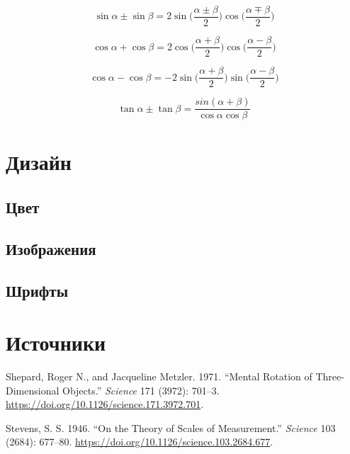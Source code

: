 \documentclass[
  letterpaper,
  DIV=11,
  numbers=noendperiod]{scrreprt}
\newlength{\cslhangindent}
\newenvironment{CSLReferences}[2] %
 {\begin{list}{}{%
  \setlength{\itemindent}{0pt}
  \setlength{\leftmargin}{0pt}
  \setlength{\parsep}{0pt}
  \ifodd #1
   \setlength{\leftmargin}{\cslhangindent}
   \setlength{\itemindent}{-1\cslhangindent}
  \fi
  \setlength{\itemsep}{#2\baselineskip}}}
 {\end{list}}
\theoremstyle{definition}
\theoremstyle{remark}
\begin{document}
\[
\sin \alpha \pm \sin \beta = 2 \sin \Big(\frac{\alpha \pm \beta}{2}\Big) \cos \Big(\frac{\alpha \mp \beta}{2}\Big)
\]

\[
\cos \alpha + \cos \beta = 2 \cos \Big(\frac{\alpha + \beta}{2}\Big) \cos \Big(\frac{\alpha - \beta}{2}\Big)
\]

\[
\cos \alpha - \cos \beta = -2 \sin \Big(\frac{\alpha + \beta}{2}\Big) \sin \Big(\frac{\alpha - \beta}{2}\Big)
\]

\[
\tan \alpha \pm \tan \beta = \frac{sin(\alpha + \beta)}{\cos \alpha \cos \beta}
\]


\chapter{Дизайн}\label{ux434ux438ux437ux430ux439ux43d}

\section{Цвет}\label{ux446ux432ux435ux442}

\section{Изображения}\label{ux438ux437ux43eux431ux440ux430ux436ux435ux43dux438ux44f}

\section{Шрифты}\label{ux448ux440ux438ux444ux442ux44b}


\chapter*{Источники}\label{ux438ux441ux442ux43eux447ux43dux438ux43aux438}


\label{refs}
\begin{CSLReferences}{1}{0}
Shepard, Roger N., and Jacqueline Metzler. 1971. {``Mental Rotation of
Three-Dimensional Objects.''} \emph{Science} 171 (3972): 701--3.
\url{https://doi.org/10.1126/science.171.3972.701}.

Stevens, S. S. 1946. {``On the Theory of Scales of Measurement.''}
\emph{Science} 103 (2684): 677--80.
\url{https://doi.org/10.1126/science.103.2684.677}.

\end{CSLReferences}
\end{document}
